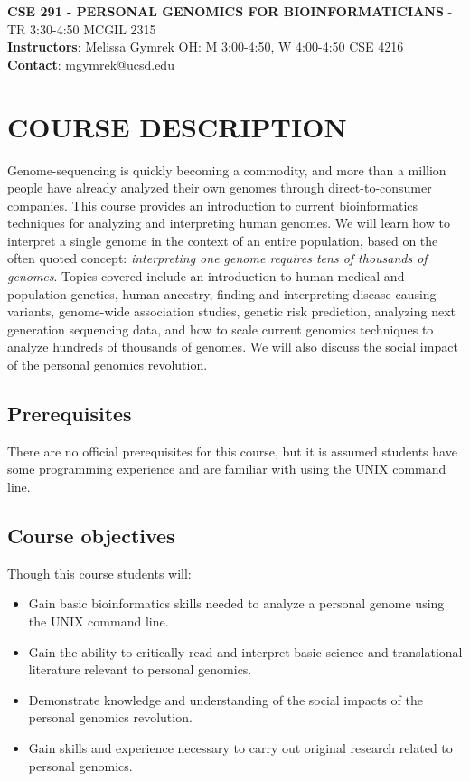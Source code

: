 \documentclass[12pt]{article}
\begin{document}
\textbf{CSE 291 - PERSONAL GENOMICS FOR BIOINFORMATICIANS} - TR 3:30-4:50 MCGIL 2315 \\
\textbf{Instructors}: Melissa Gymrek OH: M 3:00-4:50, W 4:00-4:50 CSE 4216 \\
\textbf{Contact}: mgymrek@ucsd.edu \\

\section*{COURSE DESCRIPTION}
Genome-sequencing is quickly becoming a commodity, and more than a million people have already analyzed their own genomes through direct-to-consumer companies. This course provides an introduction to current bioinformatics techniques for analyzing and interpreting human genomes. We will learn how to interpret a single genome in the context of an entire population, based on the often quoted concept: \emph{interpreting one genome requires tens of thousands of genomes}. Topics covered include an introduction to human medical and population genetics, human ancestry, finding and interpreting disease-causing variants, genome-wide association studies, genetic risk prediction, analyzing next generation sequencing data, and how to scale current genomics techniques to analyze hundreds of thousands of genomes. We will also discuss the social impact of the personal genomics revolution.

\subsection*{Prerequisites}
There are no official prerequisites for this course, but it is assumed students have some programming experience and are familiar with using the UNIX command line.

\subsection*{Course objectives}
Though this course students will:
\begin{itemize}
\setlength\itemsep{0.0em}
\item Gain basic bioinformatics skills needed to analyze a personal genome using the UNIX command line.
\item Gain the ability to critically read and interpret basic science and translational literature relevant to personal genomics.
\item Demonstrate knowledge and understanding of the social impacts of the personal genomics revolution.
\item Gain skills and experience necessary to carry out original research related to personal genomics.
\end{itemize}
\end{document}
